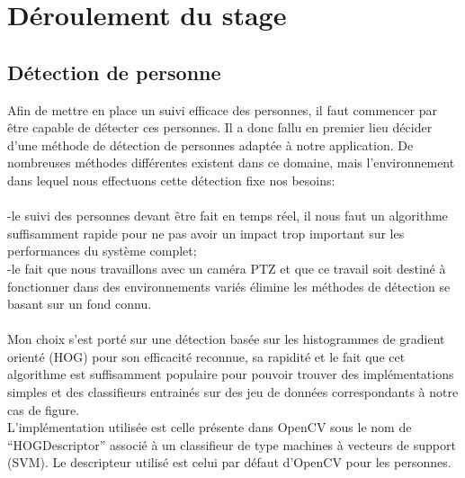 \documentclass[12pt]{article}
\begin{document}
\pagebreak
\section{Déroulement du stage}

\pagebreak
\subsection{Détection de personne}
Afin de mettre en place un suivi efficace des personnes, il faut commencer par être capable de détecter ces personnes. Il a donc fallu en premier lieu décider d'une méthode de détection de personnes adaptée à notre application. De nombreuses méthodes différentes existent dans ce domaine, mais l'environnement dans lequel nous effectuons cette détection fixe nos besoins:\\
\\
-le suivi des personnes devant être fait en temps réel, il nous faut un algorithme suffisamment rapide pour ne pas avoir un impact trop important sur les performances du système complet;\\
-le fait que nous travaillons avec un caméra PTZ et que ce travail soit destiné à fonctionner dans des environnements variés élimine les méthodes de détection se basant sur un fond connu.\\
\\
Mon choix s'est porté sur une détection basée sur les histogrammes de gradient orienté (HOG) pour son efficacité reconnue, sa rapidité et le fait que cet algorithme est suffisamment populaire pour pouvoir trouver des implémentations simples et des classifieurs entrainés sur des jeu de données correspondants à notre cas de figure.\\
L’implémentation utilisée est celle présente dans OpenCV sous le nom de ``HOGDescriptor'' associé à un classifieur de type machines à vecteurs de support (SVM). Le descripteur utilisé est celui par défaut d'OpenCV pour les personnes.
\end{document}

